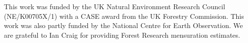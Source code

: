 \documentclass[draft,linenumbers]{agujournal}
\begin{document}
%




%
%
%
%
%
%
%


\acknowledgments
This work was funded by the UK Natural Environment Research Council (NE/K00705X/1) with a CASE award from the UK Forestry Commission. This work was also partly funded by the National Centre for Earth Observation. We are grateful to Ian Craig for providing Forest Research mensuration estimates.

\clearpage






\end{document}
